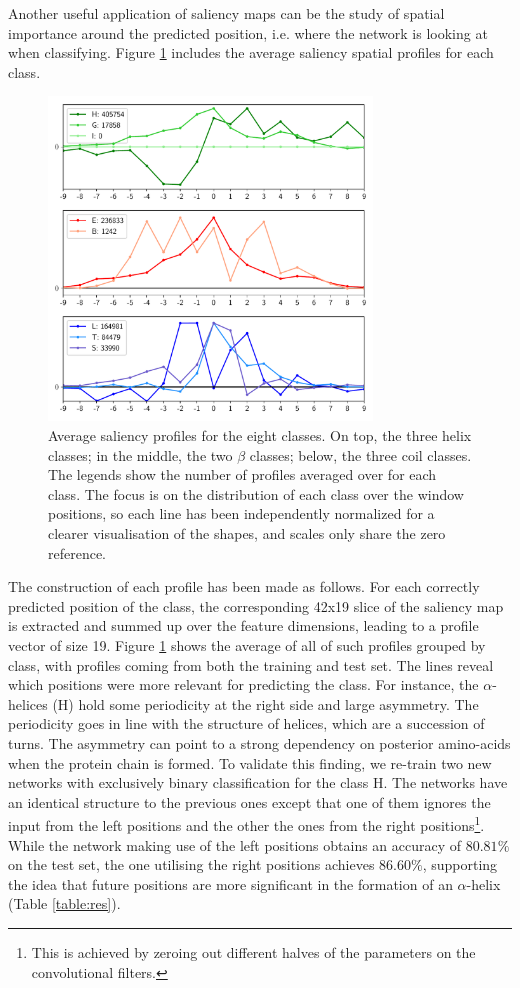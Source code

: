 \documentclass{article}
\begin{document}
Another useful application of saliency maps can be the study of spatial importance around the predicted position, i.e. where the network is looking at when classifying.
Figure \ref{fig:sheereq} includes the average saliency spatial profiles for each class.
\begin{figure}[t]
	\centering
	\centerline{\includegraphics[width=8.6cm]{sheerabsequal6016_class_aa}}
	\caption{Average saliency profiles for the eight classes.
		On top, the three helix classes; in the middle, the two $\beta$ classes; below, the three coil classes.
		The legends show the number of profiles averaged over for each class.
		The focus is on the distribution of each class over the window positions, so each line has been independently normalized for a clearer visualisation of the shapes, and scales only share the zero reference.}
	\label{fig:sheereq}
\end{figure}
The construction of each profile has been made as follows.
For each correctly predicted position of the class, the corresponding 42x19 slice of the saliency map is extracted and summed up over the feature dimensions, leading to a profile vector of size 19.
Figure \ref{fig:sheereq} shows the average of all of such profiles grouped by class, with profiles coming from both the training and test set.
The lines reveal which positions were more relevant for predicting the class.
For instance, the $\alpha$-helices (H) hold some periodicity at the right side and large asymmetry.
The periodicity goes in line with the structure of helices, which are a succession of turns.
The asymmetry can point to a strong dependency on posterior amino-acids when the protein chain is formed.
To validate this finding, we re-train two new networks with exclusively binary classification for the class H.
The networks have an identical structure to the previous ones except that one of them ignores the input from the left positions and the other the ones from the right positions\footnote{This is achieved by zeroing out different halves of the parameters on the convolutional filters.}.
While the network making use of the left positions obtains an accuracy of $80.81\%$ on the test set, the one utilising the right positions achieves $86.60\%$, supporting the idea that future positions are more significant in the formation of an $\alpha$-helix (Table \ref{table:res}).
\end{document}
